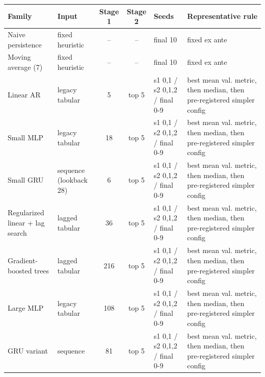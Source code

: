 \begin{tabularx}{\textwidth}{@{}l l c c >{\raggedright\arraybackslash}X >{\raggedright\arraybackslash}X@{}}
\toprule
Family & Input & Stage 1 & Stage 2 & Seeds & Representative rule \\
\midrule
Naive persistence & fixed heuristic & -- & -- & final 10 & fixed ex ante \\
Moving average (7) & fixed heuristic & -- & -- & final 10 & fixed ex ante \\
Linear AR & legacy tabular & 5 & top 5 & s1 0,1 / s2 0,1,2 / final 0-9 & best mean val. metric, then median, then pre-registered simpler config \\
Small MLP & legacy tabular & 18 & top 5 & s1 0,1 / s2 0,1,2 / final 0-9 & best mean val. metric, then median, then pre-registered simpler config \\
Small GRU & sequence (lookback 28) & 6 & top 5 & s1 0,1 / s2 0,1,2 / final 0-9 & best mean val. metric, then median, then pre-registered simpler config \\
Regularized linear + lag search & lagged tabular & 36 & top 5 & s1 0,1 / s2 0,1,2 / final 0-9 & best mean val. metric, then median, then pre-registered simpler config \\
Gradient-boosted trees & lagged tabular & 216 & top 5 & s1 0,1 / s2 0,1,2 / final 0-9 & best mean val. metric, then median, then pre-registered simpler config \\
Large MLP & legacy tabular & 108 & top 5 & s1 0,1 / s2 0,1,2 / final 0-9 & best mean val. metric, then median, then pre-registered simpler config \\
GRU variant & sequence & 81 & top 5 & s1 0,1 / s2 0,1,2 / final 0-9 & best mean val. metric, then median, then pre-registered simpler config \\
\bottomrule
\end{tabularx}
